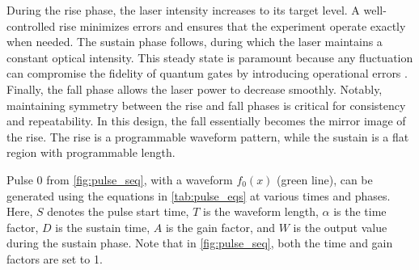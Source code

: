 During the rise phase, the laser intensity increases to its target level. A well-controlled rise minimizes errors and ensures that the experiment operate exactly when needed. The sustain phase follows, during which the laser maintains a constant optical intensity. This steady state is paramount because any fluctuation can compromise the fidelity of quantum gates by introducing operational errors \cite{naturequantuminfo}. Finally, the fall phase allows the laser power to decrease smoothly. Notably, maintaining symmetry between the rise and fall phases is critical for consistency and repeatability. In this design, the fall essentially becomes the mirror image of the rise. The rise is a programmable waveform pattern, while the sustain is a flat region with programmable length.

Pulse 0 from \autoref{fig:pulse_seq}, with a waveform \( f_0(x) \) (green line), can be generated using the equations in \autoref{tab:pulse_eqs} at various times and phases. Here, \( S \) denotes the pulse start time, \( T \) is the waveform length, \( \alpha \) is the time factor, \( D \) is the sustain time, \( A \) is the gain factor, and \( W \) is the output value during the sustain phase. Note that in \autoref{fig:pulse_seq}, both the time and gain factors are set to 1.



